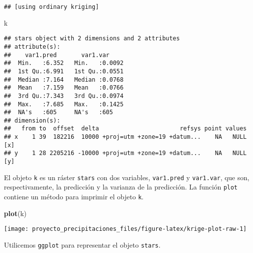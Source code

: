 \documentclass[11pt,]{article}
\newenvironment{Shaded}{\begin{snugshade}}{\end{snugshade}}
\newcommand{\KeywordTok}[1]{\textcolor[rgb]{0.13,0.29,0.53}{\textbf{#1}}}
\newcommand{\NormalTok}[1]{#1}
\begin{document}
\begin{verbatim}
## [using ordinary kriging]
\end{verbatim}

\begin{Shaded}
\begin{Highlighting}[]
\NormalTok{k}
\end{Highlighting}
\end{Shaded}

\begin{verbatim}
## stars object with 2 dimensions and 2 attributes
## attribute(s):
##    var1.pred       var1.var      
##  Min.   :6.352   Min.   :0.0092  
##  1st Qu.:6.991   1st Qu.:0.0551  
##  Median :7.164   Median :0.0768  
##  Mean   :7.159   Mean   :0.0766  
##  3rd Qu.:7.343   3rd Qu.:0.0974  
##  Max.   :7.685   Max.   :0.1425  
##  NA's   :605     NA's   :605     
## dimension(s):
##   from to  offset  delta                       refsys point values    
## x    1 39  182216  10000 +proj=utm +zone=19 +datum...    NA   NULL [x]
## y    1 28 2205216 -10000 +proj=utm +zone=19 +datum...    NA   NULL [y]
\end{verbatim}

El objeto \texttt{k} es un ráster \texttt{stars} con dos variables,
\texttt{var1.pred} y \texttt{var1.var}, que son, respectivamente, la
predicción y la varianza de la predicción. La función \texttt{plot}
contiene un método para imprimir el objeto \texttt{k}.

\begin{Shaded}
\begin{Highlighting}[]
\KeywordTok{plot}\NormalTok{(k)}
\end{Highlighting}
\end{Shaded}

\texttt{[image: proyecto\_precipitaciones\_files/figure-latex/krige-plot-raw-1]}

Utilicemos \texttt{ggplot} para representar el objeto \texttt{stars}.
\end{document}
